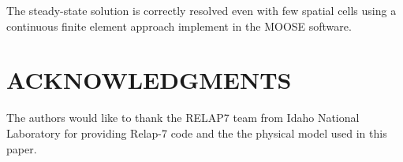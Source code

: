 \documentclass[12pt]{article}
\begin{document}
The steady-state solution is correctly resolved even with few spatial cells using a continuous finite element approach implement in the MOOSE software.

%
\section*{ACKNOWLEDGMENTS}

The authors would like to thank the RELAP7 team from Idaho National Laboratory for providing Relap-7 code and the the physical model used in this paper.

%
%
%
%
%
\end{document}
